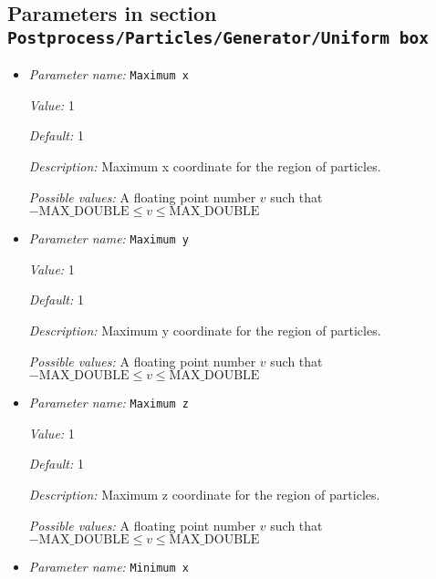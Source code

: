 \subsection{Parameters in section \tt Postprocess/Particles/Generator/Uniform box}
\label{parameters:Postprocess/Particles/Generator/Uniform_20box}

\begin{itemize}
\item {\it Parameter name:} {\tt Maximum x}
\label{parameters:Postprocess/Particles/Generator/Uniform box/Maximum x}
\label{parameters:Postprocess/Particles/Generator/Uniform_20box/Maximum_20x}


{\it Value:} 1


{\it Default:} 1


{\it Description:} Maximum x coordinate for the region of particles.


{\it Possible values:} A floating point number $v$ such that $-\text{MAX\_DOUBLE} \leq v \leq \text{MAX\_DOUBLE}$
\item {\it Parameter name:} {\tt Maximum y}
\label{parameters:Postprocess/Particles/Generator/Uniform box/Maximum y}
\label{parameters:Postprocess/Particles/Generator/Uniform_20box/Maximum_20y}


{\it Value:} 1


{\it Default:} 1


{\it Description:} Maximum y coordinate for the region of particles.


{\it Possible values:} A floating point number $v$ such that $-\text{MAX\_DOUBLE} \leq v \leq \text{MAX\_DOUBLE}$
\item {\it Parameter name:} {\tt Maximum z}
\label{parameters:Postprocess/Particles/Generator/Uniform box/Maximum z}
\label{parameters:Postprocess/Particles/Generator/Uniform_20box/Maximum_20z}


{\it Value:} 1


{\it Default:} 1


{\it Description:} Maximum z coordinate for the region of particles.


{\it Possible values:} A floating point number $v$ such that $-\text{MAX\_DOUBLE} \leq v \leq \text{MAX\_DOUBLE}$
\item {\it Parameter name:} {\tt Minimum x}
\label{parameters:Postprocess/Particles/Generator/Uniform box/Minimum x}
\label{parameters:Postprocess/Particles/Generator/Uniform_20box/Minimum_20x}



\end{itemize}

